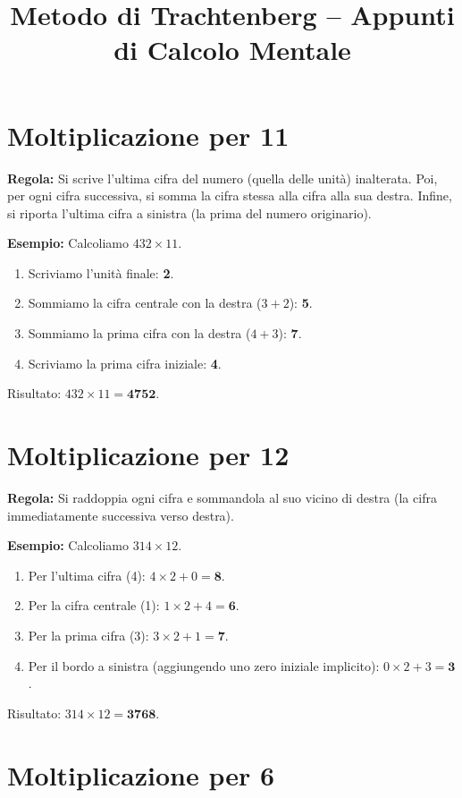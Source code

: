 \documentclass[11pt,a4paper]{article}
\title{\textbf{Metodo di Trachtenberg -- Appunti di Calcolo Mentale}}
\author{}
\date{}
\begin{document}
\maketitle

\section{Moltiplicazione per 11}

\textbf{Regola:} Si scrive l'ultima cifra del numero (quella delle unità) inalterata. Poi, per ogni cifra successiva, si somma la cifra stessa alla cifra alla sua destra. Infine, si riporta l'ultima cifra a sinistra (la prima del numero originario).

\textbf{Esempio:} Calcoliamo $432 \times 11$.
\begin{enumerate}
    \item Scriviamo l'unità finale: \textbf{2}.
    \item Sommiamo la cifra centrale con la destra ($3 + 2$): \textbf{5}.
    \item Sommiamo la prima cifra con la destra ($4 + 3$): \textbf{7}.
    \item Scriviamo la prima cifra iniziale: \textbf{4}.
\end{enumerate}
Risultato: $432 \times 11 = \mathbf{4752}$.

\section{Moltiplicazione per 12}

\textbf{Regola:} Si raddoppia ogni cifra e sommandola al suo vicino di destra (la cifra immediatamente successiva verso destra). 

\textbf{Esempio:} Calcoliamo $314 \times 12$.
\begin{enumerate}
    \item Per l'ultima cifra (4): $4 \times 2 + 0 = \mathbf{8}$.
    \item Per la cifra centrale (1): $1 \times 2 + 4 = \mathbf{6}$.
    \item Per la prima cifra (3): $3 \times 2 + 1 = \mathbf{7}$.
    \item Per il bordo a sinistra (aggiungendo uno zero iniziale implicito): $0 \times 2 + 3 = \mathbf{3}$.
\end{enumerate}
Risultato: $314 \times 12 = \mathbf{3768}$.

\section{Moltiplicazione per 6}
\end{document}
